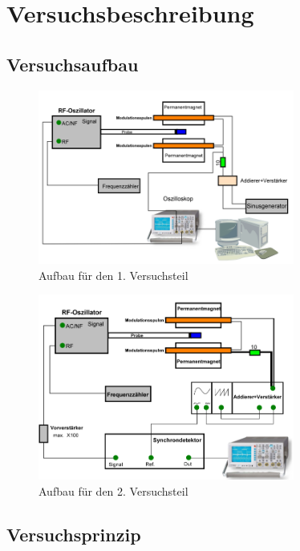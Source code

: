 \section{Versuchsbeschreibung}

\subsection{Versuchsaufbau}

\begin{figure}[H]
\centering \includegraphics[width= 0.75\textwidth]{Bilder/aufbau1.png}
\caption{Aufbau für den 1. Versuchsteil}
\end{figure}

\begin{figure}[H]
\centering \includegraphics[width=0.75\textwidth]{Bilder/aufbau2.png}
\caption{Aufbau für den 2. Versuchsteil}
\end{figure}

\subsection{Versuchsprinzip}

